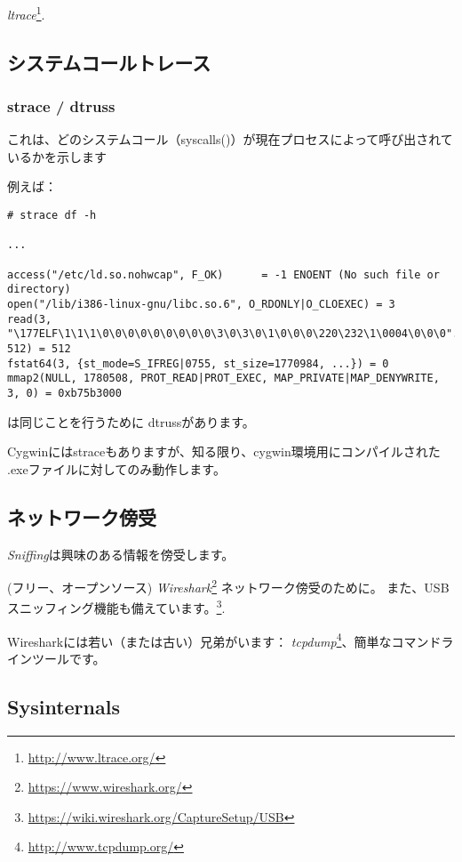 \emph{ltrace}\footnote{\url{http://www.ltrace.org/}}.

\subsection{システムコールトレース}

\label{strace}
\subsubsection{strace / dtruss}

これは、どのシステムコール（syscalls()）が現在プロセスによって呼び出されているかを示します

例えば：

\begin{lstlisting}
# strace df -h

...

access("/etc/ld.so.nohwcap", F_OK)      = -1 ENOENT (No such file or directory)
open("/lib/i386-linux-gnu/libc.so.6", O_RDONLY|O_CLOEXEC) = 3
read(3, "\177ELF\1\1\1\0\0\0\0\0\0\0\0\0\3\0\3\0\1\0\0\0\220\232\1\0004\0\0\0"..., 512) = 512
fstat64(3, {st_mode=S_IFREG|0755, st_size=1770984, ...}) = 0
mmap2(NULL, 1780508, PROT_READ|PROT_EXEC, MAP_PRIVATE|MAP_DENYWRITE, 3, 0) = 0xb75b3000
\end{lstlisting}

\myindex{\MacOSX}
\MacOSX は同じことを行うために dtrussがあります。

Cygwinにはstraceもありますが、知る限り、cygwin環境用にコンパイルされた
.exeファイルに対してのみ動作します。

\subsection{ネットワーク傍受}

\emph{Sniffing}は興味のある情報を傍受します。

(フリー、オープンソース) \emph{Wireshark}\footnote{\url{https://www.wireshark.org/}} ネットワーク傍受のために。
また、USBスニッフィング機能も備えています。\footnote{\url{https://wiki.wireshark.org/CaptureSetup/USB}}.

Wiresharkには若い（または古い）兄弟がいます： \emph{tcpdump}\footnote{\url{http://www.tcpdump.org/}}、簡単なコマンドラインツールです。

\subsection{Sysinternals}

